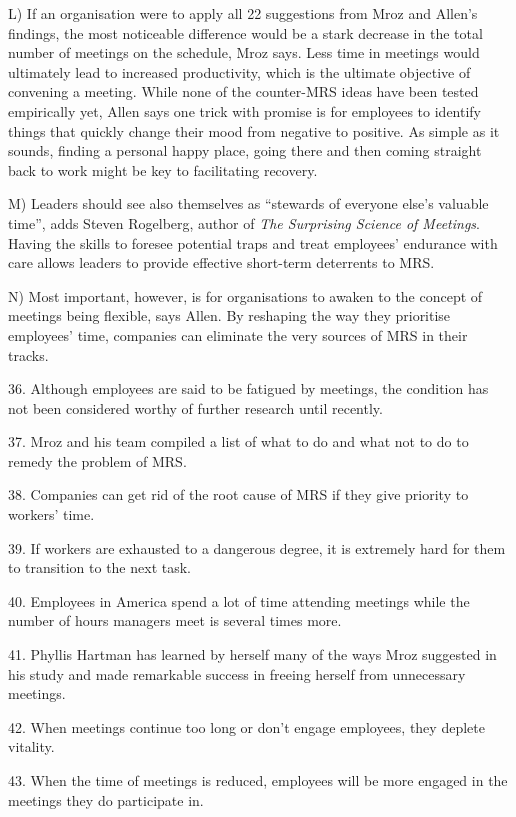 \documentclass[UTF8,11pt]{ctexart}
\begin{document}
L) If an organisation were to apply all 22 suggestions from Mroz and Allen’s findings, the most noticeable difference would be a stark decrease in the total number of meetings on the schedule, Mroz says. Less time in meetings would ultimately lead to increased productivity, which is the ultimate objective of convening a meeting. While none of the counter-MRS ideas have been tested empirically yet, Allen says one trick with promise is for employees to identify things that quickly change their mood from negative to positive. As simple as it sounds, finding a personal happy place, going there and then coming straight back to work might be key to facilitating recovery.


M) Leaders should see also themselves as “stewards of everyone else’s valuable time”, adds Steven Rogelberg, author of \textit{The Surprising Science of Meetings}. Having the skills to foresee potential traps and treat employees’ endurance with care allows leaders to provide effective short-term deterrents to MRS.


N) Most important, however, is for organisations to awaken to the concept of meetings being flexible, says Allen. By reshaping the way they prioritise employees’ time, companies can eliminate the very sources of MRS in their tracks.


36. Although employees are said to be fatigued by meetings, the condition has not been considered worthy of further research until recently.


37. Mroz and his team compiled a list of what to do and what not to do to remedy the problem of MRS.


38. Companies can get rid of the root cause of MRS if they give priority to workers’ time.


39. If workers are exhausted to a dangerous degree, it is extremely hard for them to transition to the next task.


40. Employees in America spend a lot of time attending meetings while the number of hours managers meet is several times more.


41. Phyllis Hartman has learned by herself many of the ways Mroz suggested in his study and made remarkable success in freeing herself from unnecessary meetings.


42. When meetings continue too long or don’t engage employees, they deplete vitality.


43. When the time of meetings is reduced, employees will be more engaged in the meetings they do participate in.
\end{document}
